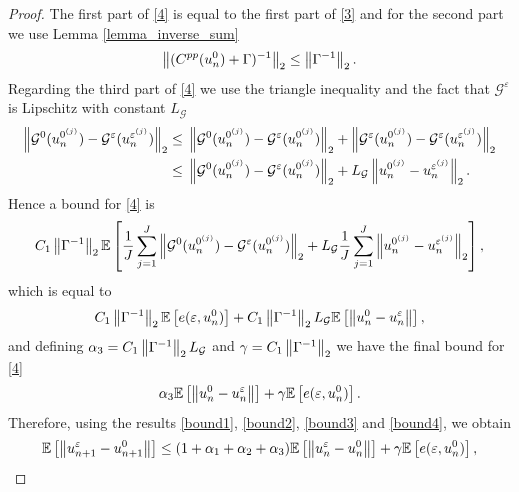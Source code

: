 \documentclass[10pt]{article}
\begin{document}
\begin{proof}
The first part of \eqref{4} is equal to the first part of \eqref{3} and for the second part we use Lemma \ref{lemma_inverse_sum}
\begin{equation*}
\left\|(C^{pp}(u_n^0) + \Gamma)^{-1}\right\|_2 \le \left\|\Gamma^{-1}\right\|_2.
\end{equation*}
Regarding the third part of \eqref{4} we use the triangle inequality and the fact that $\mathcal{G}^{\varepsilon}$ is Lipschitz with constant $L_{\mathcal{G}}$
\begin{align*}
\left\|\mathcal{G}^0(u_n^{0^{(j)}}) - \mathcal{G}^{\varepsilon}(u_n^{\varepsilon^{(j)}})\right\|_2 \le & \; \left\|\mathcal{G}^0(u_n^{0^{(j)}}) - \mathcal{G}^{\varepsilon}(u_n^{0^{(j)}})\right\|_2 + \left\|\mathcal{G}^{\varepsilon}(u_n^{0^{(j)}}) - \mathcal{G}^{\varepsilon}(u_n^{\varepsilon^{(j)}})\right\|_2 \\
\le & \; \left\|\mathcal{G}^0(u_n^{0^{(j)}}) - \mathcal{G}^{\varepsilon}(u_n^{0^{(j)}})\right\|_2 + L_{\mathcal{G}} \left\|u_n^{0^{(j)}} - u_n^{\varepsilon^{(j)}}\right\|_2.
\end{align*}
Hence a bound for \eqref{4} is
\begin{equation*}
C_1 \left\|\Gamma^{-1}\right\|_2 \mathbb{E} \left [ \frac{1}{J} \sum_{j=1}^J \left\|\mathcal{G}^0(u_n^{0^{(j)}}) - \mathcal{G}^{\varepsilon}(u_n^{0^{(j)}})\right\|_2 + L_{\mathcal{G}} \frac{1}{J} \sum_{j=1}^J \left\|u_n^{0^{(j)}} - u_n^{\varepsilon^{(j)}}\right\|_2 \right ],
\end{equation*}
which is equal to
\begin{equation*}
C_1 \left\|\Gamma^{-1}\right\|_2 \mathbb{E} \left [ e(\varepsilon, u_n^0) \right ] + C_1 \left\|\Gamma^{-1}\right\|_2 L_{\mathcal{G}} \mathbb{E} \left [ \left\|u_n^0 - u_n^{\varepsilon}\right\| \right ],
\end{equation*}
and defining $\alpha_3 = C_1 \left\|\Gamma^{-1}\right\|_2 L_{\mathcal{G}}$ and $\gamma = C_1 \left\|\Gamma^{-1}\right\|_2$ we have the final bound for \eqref{4}
\begin{equation}
\label{bound4}
\alpha_3 \mathbb{E} \left [ \left\|u_n^0 - u_n^{\varepsilon}\right\| \right ] + \gamma \mathbb{E} \left [ e(\varepsilon, u_n^0) \right ].
\end{equation}
Therefore, using the results \eqref{bound1}, \eqref{bound2}, \eqref{bound3} and \eqref{bound4}, we obtain
\begin{equation*}
\mathbb{E} \left [ \left\|u_{n+1}^{\varepsilon} - u_{n+1}^0\right\| \right ] \le (1 + \alpha_1 + \alpha_2 + \alpha_3) \mathbb{E} \left [ \left\|u_n^{\varepsilon} - u_n^0\right\| \right ] + \gamma \mathbb{E} \left [ e(\varepsilon, u_n^0) \right ],
\end{equation*}

\end{proof}
\end{document}
